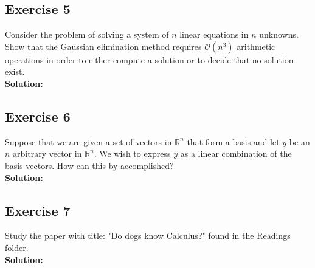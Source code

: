 \documentclass[12pt]{article}
\newcommand{\R}{\mathbb{R}}
\begin{document}
\newpage


\subsection*{Exercise 5}
Consider the problem of solving a system of $n$ linear equations in  $n$ unknowns. Show that the Gaussian elimination method requires $\mathcal{O}(n^3)$ arithmetic operations in order to either compute a solution or to decide that no solution exist.\\
\textbf{Solution:} \par

\newpage


\subsection*{Exercise 6}
Suppose that we are given a set of vectors in $\R^n$ that form a basis and let $y$ be an $n$ arbitrary vector in $\R^n$. We wish to express $y$ as a linear combination of the basis vectors. How can this by accomplished?\\
\textbf{Solution:} \par

\newpage


\subsection*{Exercise 7}
Study the paper with title: "Do dogs know Calculus?" found in the Readings folder.\\
\textbf{Solution:} \par
\end{document}
